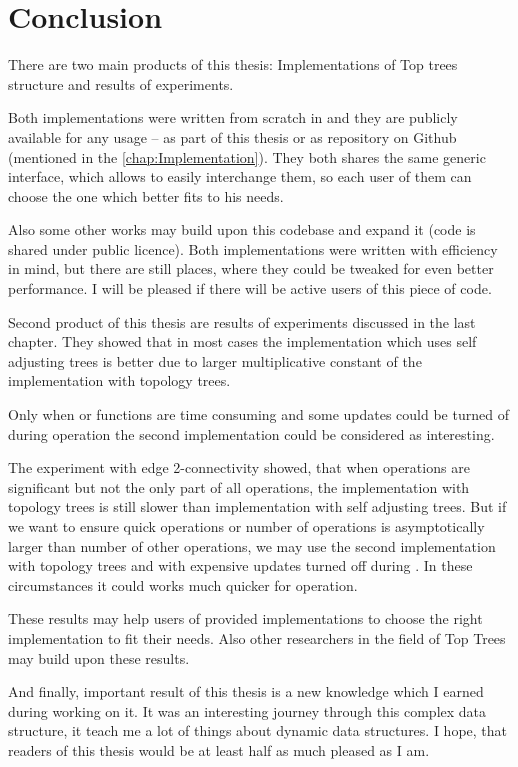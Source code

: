 \chapter*{Conclusion}

There are two main products of this thesis: Implementations of Top trees
structure and results of experiments.

Both implementations were written from scratch in \Cpp{} and they are publicly
available for any usage -- as part of this thesis or as repository on Github
(mentioned in the \cref{chap:Implementation}). They both shares the same generic
interface, which allows to easily interchange them, so each user of them can
choose the one which better fits to his needs.

Also some other works may build upon this codebase and expand it (code is shared
under public licence). Both implementations were written with efficiency in
mind, but there are still places, where they could be tweaked for even better
performance. I will be pleased if there will be active users of this piece of
code.

\bigskip

Second product of this thesis are results of experiments discussed in the last
chapter. They showed that in most cases the implementation which uses self
adjusting trees is better due to larger multiplicative constant of the
implementation with topology trees.

Only when \Join{} or \Split{} functions are time consuming and some updates
could be turned of during \Expose{} operation the second implementation could
be considered as interesting.

The experiment with edge 2-connectivity showed, that when \Expose{} operations
are significant but not the only part of all operations, the implementation with
topology trees is still slower than implementation with self adjusting trees.
But if we want to ensure quick \Expose{} operations or number of \Expose{}
operations is asymptotically larger than number of other operations, we may
use the second implementation with topology trees and with expensive
updates turned off during \Expose{}. In these circumstances it could works much
quicker for \Expose{} operation.

These results may help users of provided implementations to choose the right
implementation to fit their needs. Also other researchers in the field of Top
Trees may build upon these results.

\bigskip

And finally, important result of this thesis is a new knowledge which I earned
during working on it. It was an interesting journey through this complex data
structure, it teach me a lot of things about dynamic data structures. I hope,
that readers of this thesis would be at least half as much pleased as I am.
